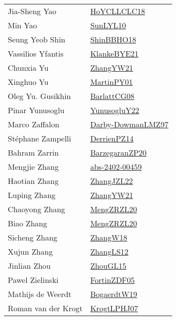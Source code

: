 {\begin{longtable}{p{4cm}p{20cm}}
Jia{-}Sheng Yao & \href{}{HoYCLLCLC18}\cite{HoYCLLCLC18} \\
Min Yao & \href{papers/SunLYL10.pdf}{SunLYL10}\cite{SunLYL10} \\
Seung Yeob Shin & \href{articles/ShinBBHO18.pdf}{ShinBBHO18}\cite{ShinBBHO18} \\
Vassilios Yfantis & \href{papers/KlankeBYE21.pdf}{KlankeBYE21}\cite{KlankeBYE21} \\
Chunxia Yu & \href{articles/ZhangYW21.pdf}{ZhangYW21}\cite{ZhangYW21} \\
Xinghuo Yu & \href{articles/MartinPY01.pdf}{MartinPY01}\cite{MartinPY01} \\
Oleg Yu. Gusikhin & \href{papers/BarlattCG08.pdf}{BarlattCG08}\cite{BarlattCG08} \\
Pinar Yunusoglu & \href{}{YunusogluY22}\cite{YunusogluY22} \\
Marco Zaffalon & \href{articles/Darby-DowmanLMZ97.pdf}{Darby-DowmanLMZ97}\cite{Darby-DowmanLMZ97} \\
St{\'{e}}phane Zampelli & \href{papers/DerrienPZ14.pdf}{DerrienPZ14}\cite{DerrienPZ14} \\
Bahram Zarrin & \href{papers/BarzegaranZP20.pdf}{BarzegaranZP20}\cite{BarzegaranZP20} \\
Mengjie Zhang & \href{articles/abs-2402-00459.pdf}{abs-2402-00459}\cite{abs-2402-00459} \\
Haotian Zhang & \href{papers/ZhangJZL22.pdf}{ZhangJZL22}\cite{ZhangJZL22} \\
Luping Zhang & \href{articles/ZhangYW21.pdf}{ZhangYW21}\cite{ZhangYW21} \\
Chaoyong Zhang & \href{articles/MengZRZL20.pdf}{MengZRZL20}\cite{MengZRZL20} \\
Biao Zhang & \href{articles/MengZRZL20.pdf}{MengZRZL20}\cite{MengZRZL20} \\
Sicheng Zhang & \href{articles/ZhangW18.pdf}{ZhangW18}\cite{ZhangW18} \\
Xujun Zhang & \href{papers/ZhangLS12.pdf}{ZhangLS12}\cite{ZhangLS12} \\
Jinlian Zhou & \href{papers/ZhouGL15.pdf}{ZhouGL15}\cite{ZhouGL15} \\
Pawel Zielinski & \href{papers/FortinZDF05.pdf}{FortinZDF05}\cite{FortinZDF05} \\
Mathijs de Weerdt & \href{papers/BogaerdtW19.pdf}{BogaerdtW19}\cite{BogaerdtW19} \\
Roman van der Krogt & \href{papers/KrogtLPHJ07.pdf}{KrogtLPHJ07}\cite{KrogtLPHJ07} \\

\end{longtable}}
